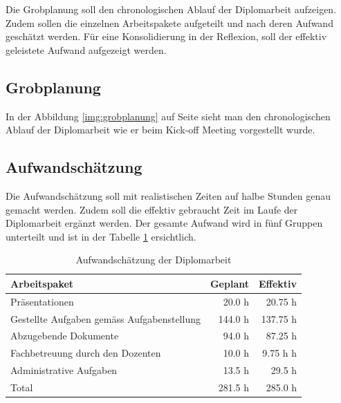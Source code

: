   Die Grobplanung soll den chronologischen Ablauf der Diplomarbeit aufzeigen.
  Zudem sollen die einzelnen Arbeitspakete aufgeteilt und nach deren Aufwand
  geschätzt werden. Für eine Konsolidierung in der Reflexion, soll der effektiv
  geleistete Aufwand aufgezeigt werden.
  
  \subsection{Grobplanung}
  
  In der Abbildung \ref{img:grobplanung} auf Seite
  \pageref{img:grobplanung} sieht man den chronologischen Ablauf der
  Diplomarbeit wie er beim Kick-off Meeting vorgestellt wurde.
  
  \subsection{Aufwandschätzung}
  
  Die Aufwandschätzung soll mit realistischen Zeiten auf halbe Stunden
  genau gemacht werden. Zudem soll die effektiv gebraucht Zeit im Laufe der
  Diplomarbeit ergänzt werden. Der gesamte Aufwand wird in fünf Gruppen
  unterteilt und ist in der Tabelle \ref{tab:planing} ersichtlich.
  \newline
  
  \begin{table}[ht]
    \sffamily 
    \begin{center}
      \begin{tabular}{p{9cm}rr}
        \toprule
        \textbf{Arbeitspaket} & \textbf{Geplant} & \textbf{Effektiv} \\
        \midrule
        Präsentationen &
        20.0 h &
        20.75 h\\
        Gestellte Aufgaben gemäss Aufgabenstellung &
        144.0 h &
        137.75 h\\
        Abzugebende Dokumente &
        94.0 h &
        87.25 h\\
        Fachbetreuung durch den Dozenten &
        10.0 h &
        9.75 h h\\
        Administrative Aufgaben &
        13.5 h &
        29.5 h\\
        \bottomrule
        Total &
        281.5 h &
        285.0 h\\
        \bottomrule
      \end{tabular}
      \caption{Aufwandschätzung der Diplomarbeit}
      \label{tab:planing}
    \end{center}
  \end{table}
    
